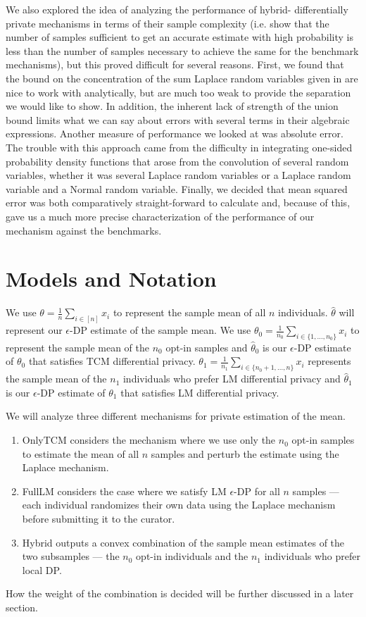 \documentclass{article}
\theoremstyle{plain}
\begin{document}
We also explored the idea of analyzing the performance of hybrid- differentially private mechanisms in terms of their sample complexity (i.e. show that the number of samples sufficient to get an accurate estimate with high probability is less than the number of samples necessary to achieve the same for the benchmark mechanisms), but this proved difficult for several reasons. First, we found that the bound on the concentration of the sum Laplace random variables given in \cite{Chan:2011:PCR:2043621.2043626} are nice to work with analytically, but are much too weak to provide the separation we would like to show. In addition, the inherent lack of strength of the union bound limits what we can say about errors with several terms in their algebraic expressions. Another measure of performance we looked at was absolute error. The trouble with this approach came from the difficulty in integrating one-sided probability density functions that arose from the convolution of several random variables, whether it was several Laplace random variables or a Laplace random variable and a Normal random variable. Finally, we decided that mean squared error was both comparatively straight-forward to calculate and, because of this, gave us a much more precise characterization of the performance of our mechanism against the benchmarks. 

\section{Models and Notation}
We use $\theta = \frac{1}{n}\sum_{i \in [n]}x_i$ to represent the sample mean of all $n$ individuals. $\hat{\theta}$ will represent our $\epsilon$-DP estimate of the sample mean. We use $\theta_0 = \frac{1}{n_0}\sum_{i \in \{1, \dots, n_0\}} x_i$ to represent the sample mean of the $n_0$ opt-in samples and $\hat{\theta}_0$ is our $\epsilon$-DP estimate of $\theta_0$ that satisfies TCM differential privacy. $\theta_1 = \frac{1}{n_1}\sum_{i \in \{n_0+1, \dots, n\}} x_i$ represents the sample mean of the $n_1$ individuals who prefer LM differential privacy and $\hat{\theta}_1$ is our $\epsilon$-DP estimate of $\theta_1$ that satisfies LM differential privacy. 

We will analyze three different mechanisms for private estimation of the mean. 
\begin{enumerate}
\item OnlyTCM considers the mechanism where we use only the $n_0$ opt-in samples to estimate the mean of all $n$ samples and perturb the estimate using the Laplace mechanism. 
\item FullLM considers the case where we satisfy LM $\epsilon$-DP for all $n$ samples — each individual randomizes their own data using the Laplace mechanism before submitting it to the curator.  
\item Hybrid outputs a convex combination of the sample mean estimates of the two subsamples — the $n_0$ opt-in individuals and the $n_1$ individuals who prefer local DP.
\end{enumerate}
How the weight of the combination is decided will be further discussed in a later section. 
\end{document}
